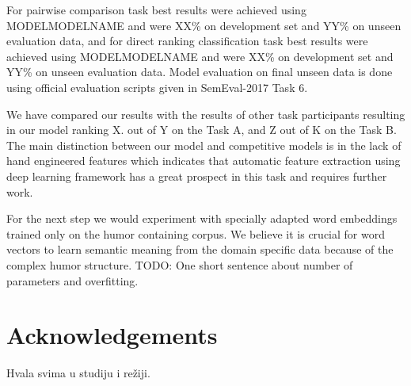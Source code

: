 \documentclass[10pt, a4paper]{article}
\begin{document}
For pairwise comparison task best results were achieved using MODELMODELNAME and were XX\% on development set and YY\% on unseen evaluation data, and for direct ranking classification task best results were achieved using MODELMODELNAME and were XX\% on development set and YY\% on unseen evaluation data. Model evaluation on final unseen data is done using official evaluation scripts given in SemEval-2017 Task 6.

We have compared our results with the results of other task participants resulting in our model ranking  X. out of Y on the Task A, and Z out of K on the Task B.  The main distinction between our model and competitive models is in the lack of hand engineered features which indicates that automatic feature extraction using deep learning framework has a great prospect in this task and requires further work.

For the next step we would experiment with specially adapted word embeddings trained only on the humor containing corpus. We believe it is crucial for word vectors to learn semantic meaning from the domain specific data because of the complex humor structure.  TODO: One short sentence about number of parameters and overfitting.

\section*{Acknowledgements}

Hvala svima u studiju i režiji.


 
\end{document}
